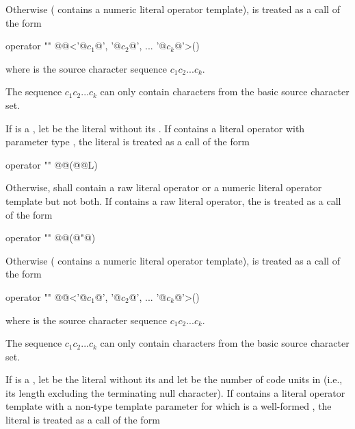 Otherwise ( contains a numeric literal operator template),
 is treated as a call of the form

\begin{codeblock}
operator "" @@<'@$c_1$@', '@$c_2$@', ... '@$c_k$@'>()
\end{codeblock}

where  is the source character sequence $c_1c_2...c_k$. \begin{note} The sequence
$c_1c_2...c_k$ can only contain characters from the basic source character set.
\end{note}

\pnum
If  is a , let  be the
literal without its . If  contains a literal operator
with parameter type , the literal  is treated as a call of
the form

\begin{codeblock}
operator "" @@(@@L)
\end{codeblock}

Otherwise,  shall contain a raw literal operator
or a numeric literal operator template but not both.
If  contains a raw literal operator,
the   is treated as a call of the form

\begin{codeblock}
operator "" @@(@"@)
\end{codeblock}

Otherwise ( contains a numeric literal operator template),
 is treated as a call of the form

\begin{codeblock}
operator "" @@<'@$c_1$@', '@$c_2$@', ... '@$c_k$@'>()
\end{codeblock}

where  is the source character sequence $c_1c_2...c_k$. \begin{note} The sequence
$c_1c_2...c_k$ can only contain characters from the basic source character set.
\end{note}

\pnum
If  is a ,
let  be the literal without its 
and let  be the number of code units in 
(i.e., its length excluding the terminating null character).
If  contains a literal operator template with
a non-type template parameter for which  is
a well-formed ,
the literal  is treated as a call of the form

